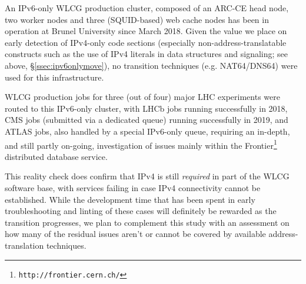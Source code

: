 %
An IPv6-only WLCG production cluster, composed of an ARC-CE head node,
two worker nodes and three (SQUID-based) web cache nodes has been
in operation at Brunel University since March 2018. Given the value
we place on early detection of IPv4-only code sections (especially
non-address-translatable constructs such as the use of IPv4 literals in
data structures and signaling; see above, \S\ref{ssec:ipv6onlymove}),
no transition techniques (e.g. NAT64/DNS64) were used for this
infrastructure.
\par
WLCG production jobs for three (out of four) major LHC experiments were routed
to this IPv6-only cluster, with LHCb jobs running successfully in
2018, CMS jobs (submitted via a dedicated queue) running successfully in 2019,
and ATLAS jobs, also handled by a special IPv6-only queue, requiring an
in-depth, and still partly on-going, investigation of issues mainly within the
Frontier\footnote{\tt http://frontier.cern.ch/} distributed database
service.
\par
This reality check does confirm that IPv4 is still {\it required} in part
of the WLCG software base, with services failing in case IPv4 connectivity
cannot be established. While the development time that has been spent in 
early troubleshooting and linting of these cases will definitely be rewarded
as the transition progresses, we plan to complement this study with 
an assessment on how many of the residual issues aren't or cannot be covered
by available address-translation techniques.

